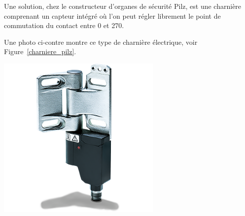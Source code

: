 \begin{minipage}[c]{0.6\textwidth}
    Une solution, chez le constructeur d'organes de sécurité Pilz, est une charnière comprenant un capteur intégré où l'on peut régler librement le point de commutation du contact entre 0\textdegree{} et 270\textdegree{}.

    Une photo ci-contre montre ce type de charnière électrique, voir Figure~\ref{charniere_pilz}.
\end{minipage}\hfill
\begin{minipage}[c]{0.35\textwidth}
    \begin{center}
        \includegraphics[width=0.6\textwidth]{assets/figures/Protections_laser/Securite_electrique/charniere_pilz.png}
    \end{center}
    \label{charniere_pilz}
\end{minipage}

